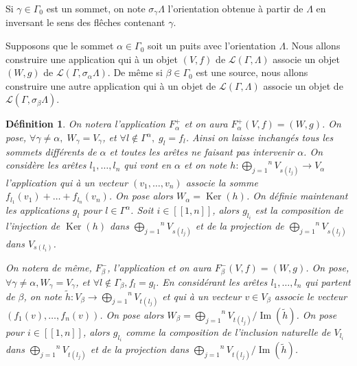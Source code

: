 \documentclass[a4paper,10pt]{article}
\newtheorem{defi}{Définition}[section]
\DeclareMathOperator{\Ker}{Ker}
\DeclareMathOperator{\Img}{Im}
\begin{document}
Si $\gamma \in \Gamma_0$ est un sommet, on note $\sigma_{\gamma}\Lambda$ l'orientation obtenue à partir de $\Lambda$ en inversant le sens des flêches contenant $\gamma$.

Supposons que le sommet $\alpha \in \Gamma_{0}$ soit un puits avec l'orientation $\Lambda$.  Nous allons construire une application qui à un objet $(V,f)$ de $\mathscr{L}(\Gamma,\Lambda)$ associe un objet $(W,g)$ de $\mathscr{L}(\Gamma,\sigma_{\alpha}\Lambda)$. De même si $\beta \in \Gamma_0$ est une source, nous allons construire une autre application qui à un objet de $\mathscr L(\Gamma,\Lambda)$ associe un objet de $\mathscr L(\Gamma,\sigma_{\beta}\Lambda)$. 

\begin{defi}
	On notera l'application $F_{\alpha}^{+}$ et on aura $F_{\alpha}^{+}(V,f)=(W,g)$. On pose, $\forall \gamma\neq\alpha,\;W_{\gamma}=V_{\gamma}$, et $\forall l \notin \Gamma^{\alpha},\; g_{l}=f_{l}$. Ainsi on laisse inchangés tous les sommets différents de $\alpha$ et toutes les arêtes ne faisant pas intervenir $\alpha$. On considère les arêtes $l_{1},\dots,l_{n}$ qui vont en $\alpha$ et on note $h:\overset{n}{\underset{j=1}{\bigoplus}}V_{s(l_{j})}\rightarrow V_{\alpha}$ l'application qui à un vecteur $(v_{1},\dots,v_{n})$ associe la somme $f_{l_{1}}(v_{1})+\dots+f_{l_{n}}(v_{n})$. On pose alors $W_{\alpha}=\Ker(h)$. On définie maintenant les applications $g_{l}$ pour $l\in\Gamma^{\alpha}$. Soit $i\in[\![1,n]\!]$, alors $g_{l_{i}}$ est la composition de l'injection de $\Ker(h)$ dans $\overset{n}{\underset{j=1}{\bigoplus}}V_{s(l_{j})}$ et de la projection de $\overset{n}{\underset{j=1}{\bigoplus}}V_{s(l_{j})}$ dans $V_{s(l_{i})}$. 

	On notera de même, $F^{-}_{\beta}$, l'application et on aura $F^{-}_{\beta}(V,f) = (W,g)$. On pose, $\forall \gamma \neq \alpha, W_\gamma = V_\gamma$, et $\forall l \notin \Gamma_\beta, f_l = g_l$. En considérant les arêtes $l_1, \dots, l_n$ qui partent de $\beta$, on note $\tilde{h} : V_\beta \rightarrow \overset{n}{\underset{j=1}{\bigoplus}}V_{t(l_{j})}$ et qui à un vecteur $v \in V_\beta$ associe le vecteur $(f_1(v),\dots, f_n(v))$. On pose alors $W_\beta = \overset{n}{\underset{j=1}{\bigoplus}}V_{t(l_{j})}/\Img(\tilde{h})$. On pose pour $i\in [\![1,n]\!]$, alors $g_{l_i}$ comme la composition de l'inclusion naturelle de $V_{l_i}$ dans $\overset{n}{\underset{j=1}{\bigoplus}}V_{t(l_{j})}$ et de la projection dans $\overset{n}{\underset{j=1}{\bigoplus}}V_{t(l_{j})}/\Img(\tilde h)$.

\end{defi}
\end{document}
